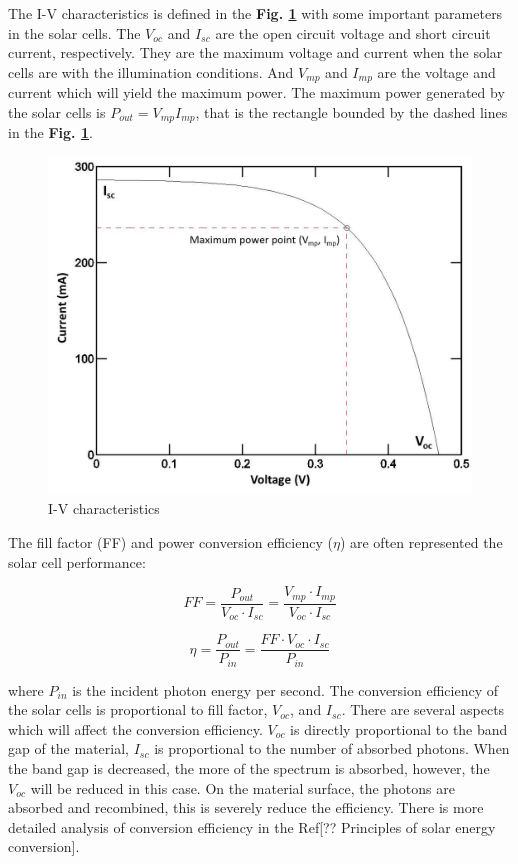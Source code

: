 \documentclass[a4paper, 12pt, titlepage,oneside,drop]{kthesis}
\begin{document}
The I-V characteristics is defined in the \textbf{Fig. \ref{ivcharac}} with some important parameters in the solar cells.
The $V_{oc}$ and $I_{sc}$ are the open circuit voltage and short circuit current, respectively. They are the maximum voltage and current when the solar cells are with the illumination conditions.
And $V_{mp}$ and $I_{mp}$ are the voltage and current which will yield the maximum power. The maximum power generated by the solar cells is $P_{out}=V_{mp} I_{mp}$, that is the rectangle bounded by the dashed lines in the 
\textbf{Fig. \ref{ivcharac}}. 

\begin{figure}[H]
\centering
\includegraphics[scale=0.5]{IV.jpg}
\caption{I-V characteristics}
\label{ivcharac}
\end{figure}


The fill factor (FF) and power conversion efficiency ($\eta$) are often represented the solar cell performance:

\begin{equation}
FF=\frac{P_{out}}{V_{oc} \cdot I_{sc}} = \frac{V_{mp} \cdot I_{mp}}{V_{oc} \cdot I_{sc}}
\end{equation}

\begin{equation}
\eta =\frac{P_{out}}{P_{in}} = \frac{FF \cdot V_{oc} \cdot I_{sc}}{P_{in}}
\end{equation}

where $P_{in}$ is the incident photon energy per second. The conversion efficiency of the solar cells is proportional to fill factor, $V_{oc}$, and $I_{sc}$. There are several aspects which will affect
the conversion efficiency. $V_{oc}$ is directly proportional to the band gap of the material, $I_{sc}$ is proportional to the number of absorbed photons. When the band gap is decreased, the more of the spectrum is absorbed, however, 
the $V_{oc}$ will be reduced in this case. On the material surface, the photons are absorbed and recombined, this is severely reduce the efficiency. There is more detailed analysis of conversion efficiency in the Ref[?? Principles of solar energy conversion].
\end{document}
